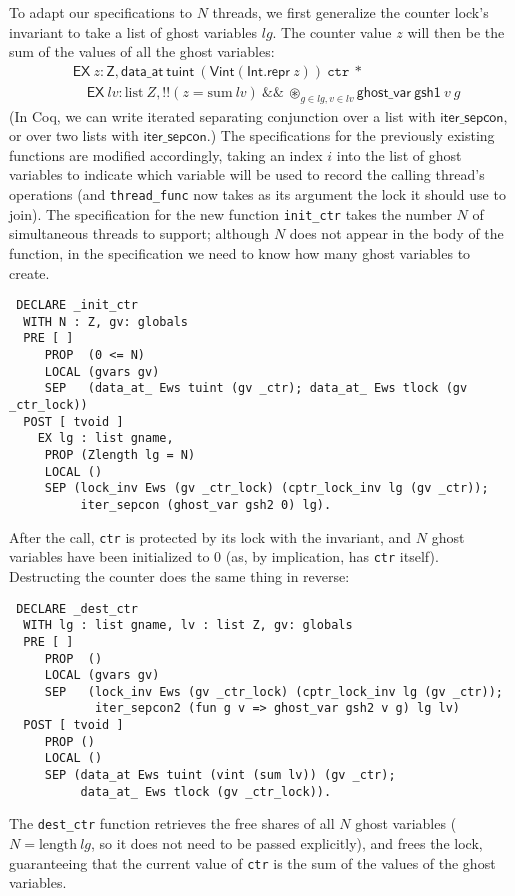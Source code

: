 \documentclass[11pt]{article}
\begin{document}
{To adapt our specifications to $N$ threads, we first generalize the counter lock's invariant to take a list of ghost variables $\mathit{lg}$. The counter value $z$ will then be the sum of the values of all the ghost variables:
\begin{align*}&\mathsf{EX}\ z : \mathsf{Z}, \mathsf{data\_at}\ \mathsf{tuint}\ (\mathsf{Vint} (\mathsf{Int.repr}\ z))\ \texttt{ctr}\ * \\&\quad\mathsf{EX}\ \mathit{lv} : \mathrm{list}\ Z, !!(z = \mathrm{sum}\ \mathit{lv}) \ \&\&\ \circledast_{g \in \mathit{lg}, v \in \mathit{lv}} \mathsf{ghost\_var}\ \mathsf{gsh1}\ v\ g\end{align*}
(In Coq, we can write iterated separating conjunction over a list with $\mathsf{iter\_sepcon}$, or over two lists with $\mathsf{iter\_sepcon}$.) The specifications for the previously existing functions are modified accordingly, taking an index $i$ into the list of ghost variables to indicate which variable will be used to record the calling thread's operations (and \texttt{thread\_func} now takes as its argument the lock it should use to join). The specification for the new function \texttt{init\_ctr} takes the number $N$ of simultaneous threads to support; although $N$ does not appear in the body of the function, in the specification we need to know how many ghost variables to create.
\begin{verbatim}
 DECLARE _init_ctr
  WITH N : Z, gv: globals
  PRE [ ]
     PROP  (0 <= N)
     LOCAL (gvars gv)
     SEP   (data_at_ Ews tuint (gv _ctr); data_at_ Ews tlock (gv _ctr_lock))
  POST [ tvoid ]
    EX lg : list gname,
     PROP (Zlength lg = N)
     LOCAL ()
     SEP (lock_inv Ews (gv _ctr_lock) (cptr_lock_inv lg (gv _ctr));
          iter_sepcon (ghost_var gsh2 0) lg).
\end{verbatim}
After the call, \texttt{ctr} is protected by its lock with the invariant, and $N$ ghost variables have been initialized to 0 (as, by implication, has \texttt{ctr} itself). Destructing the counter does the same thing in reverse:
\begin{verbatim}
 DECLARE _dest_ctr
  WITH lg : list gname, lv : list Z, gv: globals
  PRE [ ]
     PROP  ()
     LOCAL (gvars gv)
     SEP   (lock_inv Ews (gv _ctr_lock) (cptr_lock_inv lg (gv _ctr));
            iter_sepcon2 (fun g v => ghost_var gsh2 v g) lg lv)
  POST [ tvoid ]
     PROP ()
     LOCAL ()
     SEP (data_at Ews tuint (vint (sum lv)) (gv _ctr);
          data_at_ Ews tlock (gv _ctr_lock)).
\end{verbatim}
The \texttt{dest\_ctr} function retrieves the free shares of all $N$ ghost variables ($N = \mathrm{length}\ \mathit{lg}$, so it does not need to be passed explicitly), and frees the lock, guaranteeing that the current value of \texttt{ctr} is the sum of the values of the ghost variables.

}
\end{document}
